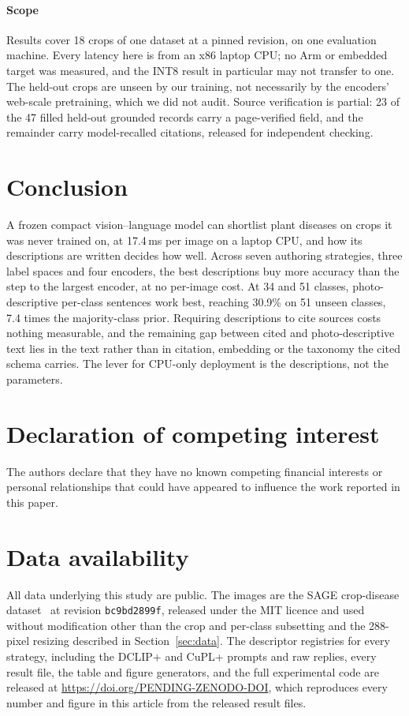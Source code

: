 \documentclass[a4paper,fleqn]{cas-dc}
\begin{document}
\paragraph{Scope} Results cover 18 crops of one dataset at a pinned revision, on one evaluation
machine. Every latency here is from an x86 laptop CPU; no Arm or embedded target was measured, and
the INT8 result in particular may not transfer to one. The held-out crops are unseen by our
training, not necessarily by the encoders' web-scale pretraining, which we did not audit. Source
verification is partial: 23 of the 47 filled held-out grounded records carry a page-verified field,
and the remainder carry model-recalled citations, released for independent checking.

\FloatBarrier
\section{Conclusion}
\label{sec:conclusion}

A frozen compact vision--language model can shortlist plant diseases on crops it was never trained
on, at 17.4\,ms per image on a laptop CPU, and how its descriptions are written decides how well.
Across seven authoring strategies, three label spaces and four encoders, the best descriptions buy
more accuracy than the step to the largest encoder, at no per-image cost. At 34 and 51 classes,
photo-descriptive per-class sentences work best, reaching 30.9\% on 51 unseen classes, 7.4 times the
majority-class prior. Requiring descriptions to cite sources costs nothing measurable, and the
remaining gap between cited and photo-descriptive text lies in the text rather than in citation,
embedding or the taxonomy the cited schema carries. The lever for CPU-only deployment is the descriptions, not the parameters.

\printcredits

\section*{Declaration of competing interest}
The authors declare that they have no known competing financial interests or personal relationships
that could have appeared to influence the work reported in this paper.

\section*{Data availability}
All data underlying this study are public. The images are the SAGE crop-disease
dataset~\citep{sagedata2026} at revision \texttt{bc9bd2899f}, released under the MIT licence and
used without modification other than the crop and per-class subsetting and the 288-pixel resizing
described in Section~\ref{sec:data}. The descriptor registries for every strategy, including the
DCLIP+ and CuPL+ prompts and raw replies, every result file, the table and figure generators, and the
full experimental code are released at \url{https://doi.org/PENDING-ZENODO-DOI}, which reproduces
every number and figure in this article from the released result files.
\end{document}
